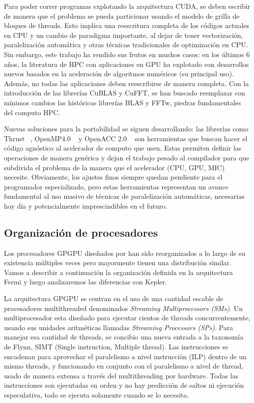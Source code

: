 Para poder correr programas explotando la arquitectura CUDA, se deben escribir de manera que
el problema se pueda particionar usando el modelo de grilla de bloques de threads. Esto implica una
reescritura completa de los c\'odigos actuales en CPU y un cambio de paradigma importante, al
dejar de tener vectorizaci\'on, paralelizaci\'on autom\'atica y otras t\'ecnicas tradicionales
de optimizaci\'on en CPU. Sin embargo, este trabajo ha rendido sus frutos en muchos casos:
en los \'ultimos 6 a\~nos, la literatura de HPC con aplicaciones en GPU ha explotado con
desarrollos nuevos basados en la aceleraci\'on de algoritmos num\'ericos (su principal uso).
Adem\'as, no todas las aplicaciones deben reescribirse de manera completa. Con la introducci\'on
de las librer\'ias CuBLAS y CuFFT, se han buscado reemplazar con m\'inimos cambios las hist\'oricas
librer\'ias BLAS y FFTw, piedras fundamentales del computo HPC.~\cite{cublas}~\cite{cufft}

Nuevas soluciones para la portabilidad se siguen desarrollando: las librer\'ias como Thrust ~\cite{thrust},
OpenMP4.0 ~\cite{OpenMPspec} y OpenACC 2.0 ~\cite{OpenACCSpec} son herramientas que buscan hacer el
c\'odigo agn\'ostico al acelerador de computo que usen. Estas permiten definir las operaciones de
manera gen\'erica y dejan el trabajo pesado al compilador para que subdivida el problema de la manera
que el acelerador (CPU, GPU, MIC) necesite. Obviamente, los ajustes finos siempre quedan pendiente para
el programador especializado, pero estas herramientas representan un avance fundamental al uso
masivo de t\'ecnicas de paralelizaci\'on autom\'aticas, necesarias hoy d\'ia y potencialmente
imprescindibles en el futuro.

\subsection{Organizaci\'on de procesadores}

Los procesadores GPGPU dise\~nados por \nvidia han sido reorganizados a lo largo de su
existencia m\'ultiples veces pero mayormente tienen una distribuci\'on similar. Vamos a describir a continuaci\'on
la organizaci\'on definida en la arquitectura Fermi y luego analizaremos las diferencias con Kepler.

La arquitectura GPGPU se centran en el uso de una cantidad escable de procesadores
multithreaded denominados \textit{Streaming Multiprocessors (SMs)}. Un multiprocesador esta dise\~nado
para ejecutar cientos de threads concurrentemente, usando sus unidades aritm\'eticas llamadas \textit{Streaming
Processors (SPs)}. Para manejar esa cantidad de threads, se concibio una nueva entrada a la taxonom\'ia de Flynn,
SIMT (Single instruction, Multiple thread). Las instrucciones se encadenan para aprovechar el paralelismo
a nivel instrucci\'on (ILP) dentro de un mismo threads, y funcionando en conjunto con el paralelismo
a nivel de thread, usado de manera extensa a trav\'es del multithreading por hardware. Todas las instrucciones
son ejecutadas en orden y no hay predicci\'on de saltos ni ejecuci\'on especulativa, todo se ejecuta solamente
cuando se lo necesita. ~\cite{CudaOverview}

